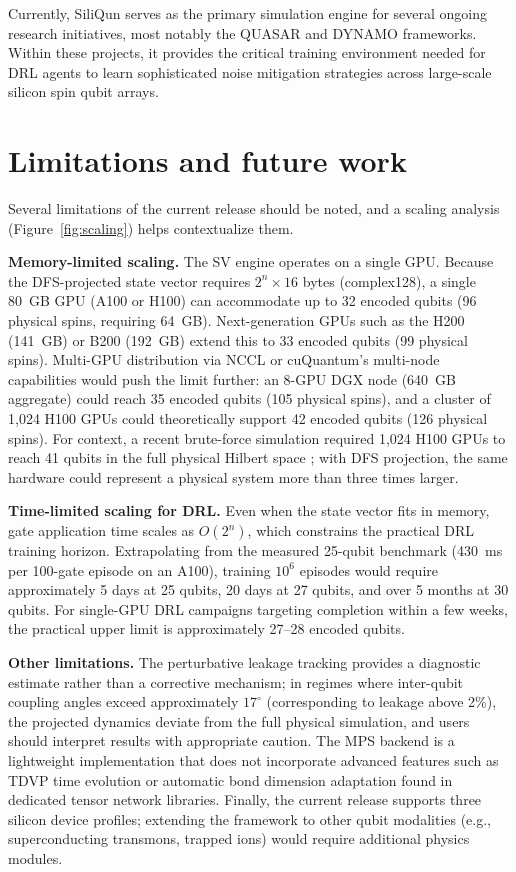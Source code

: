 \documentclass[preprint,12pt, a4paper]{elsarticle}
\begin{document}
Currently, SiliQun serves as the primary simulation engine for several ongoing research initiatives, most notably the QUASAR and DYNAMO frameworks. Within these projects, it provides the critical training environment needed for DRL agents to learn sophisticated noise mitigation strategies across large-scale silicon spin qubit arrays.

\section{Limitations and future work}
\label{sec:limitations}

Several limitations of the current release should be noted, and a scaling analysis (Figure~\ref{fig:scaling}) helps contextualize them.

\textbf{Memory-limited scaling.} The SV engine operates on a single GPU. Because the DFS-projected state vector requires $2^n \times 16$ bytes (complex128), a single 80~GB GPU (A100 or H100) can accommodate up to 32 encoded qubits (96 physical spins, requiring 64~GB). Next-generation GPUs such as the H200 (141~GB) or B200 (192~GB) extend this to 33 encoded qubits (99 physical spins). Multi-GPU distribution via NCCL or cuQuantum's multi-node capabilities would push the limit further: an 8-GPU DGX node (640~GB aggregate) could reach 35 encoded qubits (105 physical spins), and a cluster of 1,024 H100 GPUs could theoretically support 42 encoded qubits (126 physical spins). For context, a recent brute-force simulation required 1,024 H100 GPUs to reach 41 qubits in the full physical Hilbert space \cite{hiraoka2026chemqulacs}; with DFS projection, the same hardware could represent a physical system more than three times larger.

\textbf{Time-limited scaling for DRL.} Even when the state vector fits in memory, gate application time scales as $O(2^n)$, which constrains the practical DRL training horizon. Extrapolating from the measured 25-qubit benchmark (430~ms per 100-gate episode on an A100), training $10^6$ episodes would require approximately 5 days at 25 qubits, 20 days at 27 qubits, and over 5 months at 30 qubits. For single-GPU DRL campaigns targeting completion within a few weeks, the practical upper limit is approximately 27--28 encoded qubits.

\textbf{Other limitations.} The perturbative leakage tracking provides a diagnostic estimate rather than a corrective mechanism; in regimes where inter-qubit coupling angles exceed approximately $17^\circ$ (corresponding to leakage above 2\%), the projected dynamics deviate from the full physical simulation, and users should interpret results with appropriate caution. The MPS backend is a lightweight implementation that does not incorporate advanced features such as TDVP time evolution or automatic bond dimension adaptation found in dedicated tensor network libraries. Finally, the current release supports three silicon device profiles; extending the framework to other qubit modalities (e.g., superconducting transmons, trapped ions) would require additional physics modules.
\end{document}
